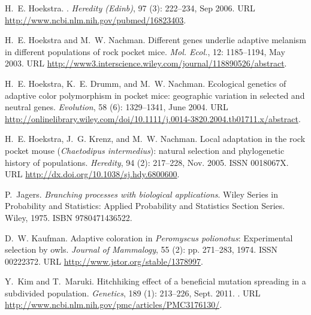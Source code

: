 \documentclass[10pt,letterpaper]{article}
\begin{document}
\begin{thebibliography}{68}
H.~E. Hoekstra.
.
\newblock \emph{Heredity (Edinb)}, 97 (3): 222--234, Sep
  2006.
\newblock URL \url{http://www.ncbi.nlm.nih.gov/pubmed/16823403}.

H.~E. Hoekstra and M.~W. Nachman.
\newblock Different genes underlie adaptive melanism in different populations
  of rock pocket mice.
\newblock \emph{Mol. Ecol.}, 12: 1185--1194, May 2003.
\newblock URL
  \url{http://www3.interscience.wiley.com/journal/118890526/abstract}.

H.~E. Hoekstra, K.~E. Drumm, and M.~W. Nachman.
\newblock Ecological genetics of adaptive color polymorphism in pocket mice:
  geographic variation in selected and neutral genes.
\newblock \emph{Evolution}, 58 (6): 1329--1341, June 2004.
\newblock URL
  \url{http://onlinelibrary.wiley.com/doi/10.1111/j.0014-3820.2004.tb01711.x/abstract}.

H.~E. Hoekstra, J.~G. Krenz, and M.~W. Nachman.
\newblock Local adaptation in the rock pocket mouse (\textit{{Chaetodipus}
  intermedius}): natural selection and phylogenetic history of populations.
\newblock \emph{Heredity}, 94 (2): 217--228, Nov. 2005.
\newblock ISSN 0018067X.
\newblock URL \url{http://dx.doi.org/10.1038/sj.hdy.6800600}.

P.~Jagers.
\newblock \emph{Branching processes with biological applications}.
\newblock Wiley Series in Probability and Statistics: Applied Probability and
  Statistics Section Series. Wiley, 1975.
\newblock ISBN 9780471436522.

D.~W. Kaufman.
\newblock Adaptive coloration in \textit{{Peromyscus} polionotus}: Experimental
  selection by owls.
\newblock \emph{Journal of Mammalogy}, 55 (2): pp. 271--283,
  1974.
\newblock ISSN 00222372.
\newblock URL \url{http://www.jstor.org/stable/1378997}.

Y.~Kim and T.~Maruki.
\newblock Hitchhiking effect of a beneficial mutation spreading in a subdivided
  population.
\newblock \emph{Genetics}, 189 (1): 213--226, Sept. 2011.
\newblock {}.
\newblock URL \url{http://www.ncbi.nlm.nih.gov/pmc/articles/PMC3176130/}.


\end{thebibliography}
\end{document}
